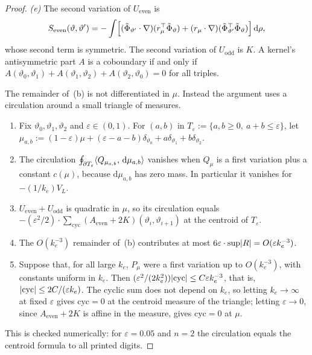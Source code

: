 \begin{proof}
\noindent\emph{(e)} The second variation of $U_{\mathrm{even}}$ is
\[
  S_{\mathrm{even}}(\vartheta,\vartheta')
  = -\int\Bigl[(\tilde\Phi_{\vartheta'}\cdot\nabla)(r_\mu^\top\tilde\Phi_\vartheta)
    + (r_\mu\cdot\nabla)(\tilde\Phi_{\vartheta'}^\top\tilde\Phi_\vartheta)\Bigr]\,\mathrm{d}\rho,
\]
whose second term is symmetric. The second variation of $U_{\mathrm{odd}}$ is $K$. A kernel's antisymmetric part $A$
is a coboundary if and only if $A(\vartheta_0,\vartheta_1) + A(\vartheta_1,\vartheta_2) + A(\vartheta_2,\vartheta_0)
= 0$ for all triples.

The remainder of~(b) is not differentiated in $\mu$. Instead the argument uses a circulation around a small triangle of
measures.
\begin{enumerate}[label=\arabic*.]
  \item Fix $\vartheta_0,\vartheta_1,\vartheta_2$ and $\varepsilon\in(0,1)$. For $(a,b)$ in
    $T_\varepsilon := \{a,b\ge0,\ a+b\le\varepsilon\}$, let
    $\mu_{a,b} := (1-\varepsilon)\mu + (\varepsilon-a-b)\delta_{\vartheta_0} + a\delta_{\vartheta_1}
    + b\delta_{\vartheta_2}$.
  \item The circulation $\oint_{\partial T_\varepsilon}\langle Q_{\mu_{a,b}},\, \mathrm{d}\mu_{a,b}\rangle$ vanishes when $Q_\mu$
    is a first variation plus a constant $c(\mu)$, because $\mathrm{d}\mu_{a,b}$ has zero mass. In particular it
    vanishes for $-(1/k_e)V_L$.
  \item $U_{\mathrm{even}}+U_{\mathrm{odd}}$ is quadratic in $\mu$, so its circulation equals
    $-(\varepsilon^2/2)\cdot\sum_{\mathrm{cyc}}(A_{\mathrm{even}}+2K)(\vartheta_i,\vartheta_{i+1})$ at the centroid of
    $T_\varepsilon$.
  \item The $O(k_e^{-3})$ remainder of~(b) contributes at most $6\varepsilon\cdot\sup\lvert R\rvert = O(\varepsilon k_e^{-3})$.
  \item Suppose that, for all large $k_e$, $P_\mu$ were a first variation up to $O(k_e^{-3})$, with constants uniform
    in $k_e$. Then $(\varepsilon^2/(2k_e^2))\lvert \mathrm{cyc}\rvert\le C\varepsilon k_e^{-3}$, that is,
    $\lvert \mathrm{cyc}\rvert\le 2C/(\varepsilon k_e)$. The cyclic sum does not depend on $k_e$, so letting
    $k_e\to\infty$ at fixed $\varepsilon$ gives $\mathrm{cyc}=0$ at the centroid measure of the triangle; letting
    $\varepsilon\to0$, since $A_{\mathrm{even}}+2K$ is affine in the measure, gives $\mathrm{cyc}=0$ at $\mu$.
\end{enumerate}
This is checked numerically: for $\varepsilon=0.05$ and $n=2$ the circulation equals the centroid formula to all
printed digits.
\end{proof}


